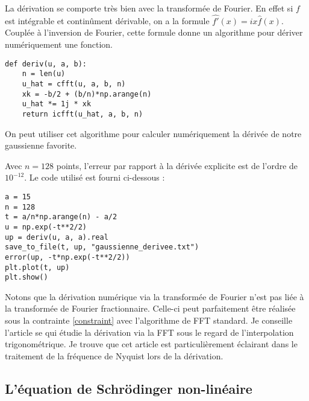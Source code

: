 \documentclass{article}
\begin{document}
La dérivation se comporte très bien avec la transformée de Fourier. En effet si $f$ est intégrable et continûment dérivable, on a la formule $\hat{f'}(x)= ix\hat{f}(x)$. Couplée à l'inversion de Fourier, cette formule donne un algorithme pour dériver numériquement une fonction.

\begin{verbatim}
def deriv(u, a, b):
    n = len(u)
    u_hat = cfft(u, a, b, n)
    xk = -b/2 + (b/n)*np.arange(n)
    u_hat *= 1j * xk
    return icfft(u_hat, a, b, n)
\end{verbatim}

On peut utiliser cet algorithme pour calculer numériquement la dérivée de notre gaussienne favorite. 
\begin{center}
\end{center}

Avec $n=128$ points, l'erreur par rapport à la dérivée explicite est de l'ordre de $10^{-12}$. Le code utilisé est fourni ci-dessous :

\begin{verbatim}
a = 15
n = 128
t = a/n*np.arange(n) - a/2
u = np.exp(-t**2/2)
up = deriv(u, a, a).real
save_to_file(t, up, "gaussienne_derivee.txt")
error(up, -t*np.exp(-t**2/2))
plt.plot(t, up)
plt.show()
\end{verbatim}

Notons que la dérivation numérique via la transformée de Fourier n'est pas liée à la transformée de Fourier fractionnaire. Celle-ci peut parfaitement être réalisée sous la contrainte \eqref{constraint} avec l'algorithme de FFT standard. Je conseille l'article se \cite{DERIV} qui étudie la dérivation via la FFT sous le regard de l'interpolation trigonométrique. Je trouve que cet article est particulièrement éclairant dans le traitement de la fréquence de Nyquist lors de la dérivation.

\subsection{L'équation de Schrödinger non-linéaire}
\end{document}
